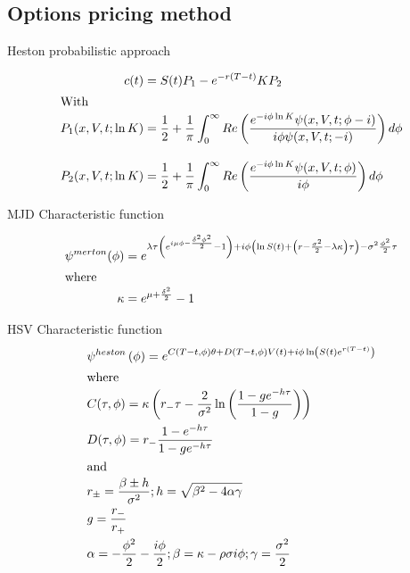 \documentclass{beamer}
\begin{document}
\subsection{Options pricing method}
\begin{frame}{Heston probabilistic approach}


\begin{align}
  c(t) &= S(t) P_1 - e^{-r(T-t)} K P_2 \notag \\
\intertext{With}
  P_1(x,V,t;\ln{K}) &= \frac{1}{2} + \frac{1}{\pi} \int_0^{\infty} Re \left( \frac{e^{-i\phi\ln{K}} \psi(x,V,t;\phi - i)}{i\phi\psi(x,V,t;-i)} \right) d\phi \notag \\ 
  \intertext{}
  P_2(x,V,t;\ln{K}) &= \frac{1}{2} + \frac{1}{\pi} \int_0^{\infty} Re \left( \frac{e^{-i\phi\ln{K}} \psi(x,V,t;\phi)}{i\phi} \right) d\phi \notag
\end{align}
  


 
\end{frame}


\begin{frame}{MJD Characteristic function}



\begin{align}
\psi^{merton}(\phi) &= e^{ 
  \lambda \tau \left( e^{i \mu \phi - \frac{\delta^2 \phi^2}{2}} - 1\right) +
  i \phi \left( \ln S(t) + \left(  r - \frac{\sigma^2}{2} - \lambda \kappa \right) \tau \right) -
  \sigma^2 \frac{\phi^2}{2} \tau
}
\notag \\
\intertext{where}
\kappa &= e^{\mu + \frac{\delta^2}{2}} - 1 \notag \\
\end{align}
 
\end{frame}


\begin{frame}{HSV Characteristic function}
\begin{align}
  &\psi^{heston}\left(\phi\right) = e^{C(T-t, \phi)\theta + D(T-t, \phi)V(t) + i\phi\ln\left(S(t)e^{r(T-t)}\right)} \notag \\
  \intertext{where}
  &C(\tau, \phi) = \kappa \left(r_{-} \tau - \frac{2}{\sigma^2}\ln\left(\frac{1 - g e^{-h\tau}}{1 - g}\right)\right) \notag \\
  &D(\tau, \phi) = r_{-}\frac{1 - e^{-h\tau}}{1 - ge^{-h\tau}} \notag \\ 
  \intertext{and}
  &r_{\pm} = \frac{\beta \pm h}{\sigma^2}; h = \sqrt{\beta^2 - 4\alpha\gamma} \notag \\
  &g = \frac{r_{-}}{r_{+}} \notag \\
  &\alpha = -\frac{\phi^2}{2} - \frac{i\phi}{2}; \beta = \kappa - \rho\sigma i\phi; \gamma = \frac{\sigma^2}{2} \notag
\end{align}

 
\end{frame}
\end{document}
